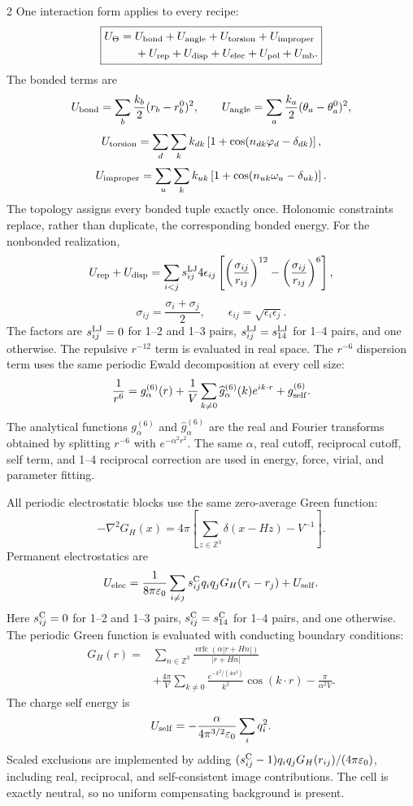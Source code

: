 \documentclass[10pt]{article}
\begin{document}
\begin{multicols}{2}
One interaction form applies to every recipe:
\[
\boxed{\begin{aligned}
U_\Theta={}&
U_{\rm bond}+U_{\rm angle}+U_{\rm torsion}+U_{\rm improper}\\
&+U_{\rm rep}+U_{\rm disp}+U_{\rm elec}+U_{\rm pol}+U_{\rm mb}.
\end{aligned}}
\]
The bonded terms are
\[
U_{\rm bond}=\sum_b\frac{k_b}{2}(r_b-r_b^0)^2,\qquad
U_{\rm angle}=\sum_a\frac{k_a}{2}(\theta_a-\theta_a^0)^2,
\]
\[
U_{\rm torsion}=\sum_d\sum_k
k_{dk}\left[1+\cos(n_{dk}\varphi_d-\delta_{dk})\right],
\]
\[
U_{\rm improper}=\sum_u\sum_k
k_{uk}\left[1+\cos(n_{uk}\omega_u-\delta_{uk})\right].
\]
The topology assigns every bonded tuple exactly once.  Holonomic constraints
replace, rather than duplicate, the corresponding bonded energy.  For the
nonbonded realization,
\[
U_{\rm rep}+U_{\rm disp}=
\sum_{i<j}s^{\rm LJ}_{ij}4\epsilon_{ij}
\left[\left(\frac{\sigma_{ij}}{r_{ij}}\right)^{12}
-\left(\frac{\sigma_{ij}}{r_{ij}}\right)^6\right],
\]
\[
\sigma_{ij}=\frac{\sigma_i+\sigma_j}{2},\qquad
\epsilon_{ij}=\sqrt{\epsilon_i\epsilon_j}.
\]
The factors are \(s^{\rm LJ}_{ij}=0\) for 1--2 and 1--3 pairs,
\(s^{\rm LJ}_{ij}=s^{\rm LJ}_{14}\) for 1--4 pairs, and one otherwise.
The repulsive \(r^{-12}\) term is evaluated in real space.  The \(r^{-6}\)
dispersion term uses the same periodic Ewald decomposition at every cell size:
\[
\frac{1}{r^6}=g^{(6)}_{\alpha}(r)
+\frac{1}{V}\sum_{k\ne0}\widehat g^{(6)}_{\alpha}(k)e^{ik\cdot r}
+g^{(6)}_{\rm self}.
\]
The analytical functions \(g^{(6)}_\alpha\) and
\(\widehat g^{(6)}_\alpha\) are the real and Fourier transforms obtained by
splitting \(r^{-6}\) with \(e^{-\alpha^2r^2}\).  The same \(\alpha\), real cutoff,
reciprocal cutoff, self term, and 1--4 reciprocal correction are used in energy,
force, virial, and parameter fitting.

All periodic electrostatic blocks use the same zero-average Green function:
\[
-\nabla^2G_H(x)=4\pi\left[
\sum_{z\in\mathbb Z^3}\delta(x-Hz)-V^{-1}\right].
\]
Permanent electrostatics are
\[
U_{\rm elec}=
\frac{1}{8\pi\varepsilon_0}\sum_{i\ne j}
s^{\rm C}_{ij}q_iq_jG_H(r_i-r_j)+U_{\rm self}.
\]
Here \(s^{\rm C}_{ij}=0\) for 1--2 and 1--3 pairs,
\(s^{\rm C}_{ij}=s^{\rm C}_{14}\) for 1--4 pairs, and one otherwise.
The periodic Green function is evaluated with conducting boundary conditions:
\[
\begin{aligned}
G_H(r)={}&
\sum_{n\in\mathbb Z^3}
\frac{\operatorname{erfc}(\alpha|r+Hn|)}{|r+Hn|}\\
&+\frac{4\pi}{V}\sum_{k\ne0}
\frac{e^{-k^2/(4\alpha^2)}}{k^2}\cos(k\cdot r)
-\frac{\pi}{\alpha^2V}.
\end{aligned}
\]
The charge self energy is
\[
U_{\rm self}=-\frac{\alpha}{4\pi^{3/2}\varepsilon_0}\sum_iq_i^2.
\]
Scaled exclusions are implemented by adding
\((s^{\rm C}_{ij}-1)q_iq_jG_H(r_{ij})/(4\pi\varepsilon_0)\), including real,
reciprocal, and self-consistent image contributions.  The cell is exactly neutral,
so no uniform compensating background is present.


\end{multicols}
\end{document}
